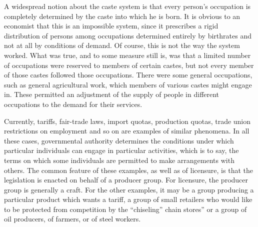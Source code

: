 \documentclass[11pt,openany]{book}
\begin{document}
A widespread notion about the caste system is that every person's occupation is completely determined by the caste into which he is born. It is obvious to an economist that this is an impossible system, since it prescribes a rigid distribution of persons among occupations determined entirely by birthrates and not at all by conditions of demand. Of course, this is not the way the system worked. What was true, and to some measure still is, was that a limited number of occupations were reserved to members of certain castes, but not every member of those castes followed those occupations. There were some general occupations, such as general agricultural work, which members of various castes might engage in. These permitted an adjustment of the supply of people in different occupations to the demand for their services.

Currently, tariffs, fair-trade laws, import quotas, production quotas, trade union restrictions on employment and so on are examples of similar phenomena. In all these cases, governmental authority determines the conditions under which particular individuals can engage in particular activities, which is to say, the terms on which some individuals are permitted to make arrangements with others. The common feature of these examples, as well as of licensure, is that the legislation is enacted on behalf of a producer group. For licensure, the producer group is generally a craft. For the other examples, it may be a group producing a particular product which wants a tariff, a group of small retailers who would like to be protected from competition by the ``chiseling'' chain stores'' or a group of oil producers, of farmers, or of steel workers.
\end{document}
